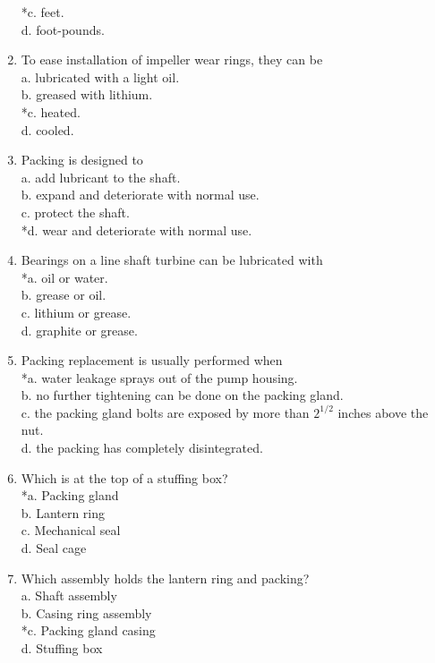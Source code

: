 \begin{enumerate}[1.]
*c. feet.\\
d. foot-pounds.\\
\item To ease installation of impeller wear rings, they can be\\
a. lubricated with a light oil.\\
b. greased with lithium.\\
*c. heated.\\
d. cooled.\\
\item Packing is designed to\\
a. add lubricant to the shaft.\\
b. expand and deteriorate with normal use.\\
c. protect the shaft.\\
*d. wear and deteriorate with normal use.\\
\item Bearings on a line shaft turbine can be lubricated with\\
*a. oil or water.\\
b. grease or oil.\\
c. lithium or grease.\\
d. graphite or grease.\\
\item Packing replacement is usually performed when\\
*a. water leakage sprays out of the pump housing.\\
b. no further tightening can be done on the packing gland.\\
c. the packing gland bolts are exposed by more than $2^{1 / 2}$ inches above the nut.\\
d. the packing has completely disintegrated.\\
\item Which is at the top of a stuffing box?\\
*a. Packing gland\\
b. Lantern ring\\
c. Mechanical seal\\
d. Seal cage\\
\item Which assembly holds the lantern ring and packing?\\
a. Shaft assembly\\
b. Casing ring assembly\\
*c. Packing gland casing\\
d. Stuffing box\\

\end{enumerate}
